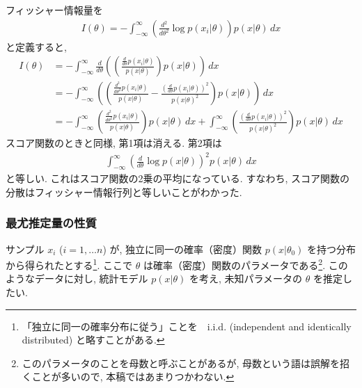 \documentclass{jarticle}
\begin{document}
フィッシャー情報量を
\begin{align}
I(\theta)=-\int^{\infty}_{-\infty}\left(\frac{d^2}{d \theta^2} \log p(x_i | \theta)\right) p(x|\theta) \, dx
\end{align}
と定義すると, 
\begin{align}
I(\theta)&=-\int^{\infty}_{-\infty}\frac{d}{d \theta} \left(\left(\frac{\frac{d}{d\theta} p(x_i | \theta)}{p(x|\theta)}\right) p(x|\theta) \right) \, dx \\
&=-\int^{\infty}_{-\infty}\left(\left(\frac{\frac{d^2}{d\theta^2} p(x_i | \theta)}{p(x|\theta)} - \frac{ ( \frac{d}{d\theta} p(x_i | \theta))^2}{p(x|\theta)^2 }\right) p(x|\theta) \right) \, dx \\
&=-\int^{\infty}_{-\infty}\left(\frac{\frac{d^2}{d\theta^2} p(x_i | \theta)}{p(x|\theta)}\right) p(x|\theta) \, dx +\int^{\infty}_{-\infty}\left( \frac{ ( \frac{d}{d\theta} p(x_i | \theta))^2}{p(x|\theta)^2 }\right) p(x|\theta) \, dx
\end{align}
スコア関数のときと同様, 第1項は消える. 
第2項は
\begin{align}
\int^{\infty}_{-\infty}\left(\frac{d}{d\theta} \log p(x | \theta)\right)^2 p(x|\theta) \, dx 
\end{align}
と等しい. これはスコア関数の2乗の平均になっている. 
すなわち, スコア関数の分散はフィッシャー情報行列と等しいことがわかった. 

\subsubsection{最尤推定量の性質}
サンプル $x_i$ ($i=1,\ldots n$) が, 独立に同一の確率（密度）関数 $p(x|\theta_0)$ を持つ分布から得られたとする\footnote{ 「独立に同一の確率分布に従う」ことを　i.i.d. (independent and identically distributed) と略すことがある.}. ここで $\theta$ は確率（密度）関数のパラメータである\footnote{このパラメータのことを母数と呼ぶことがあるが, 母数という語は誤解を招くことが多いので, 本稿ではあまりつかわない.}.  
このようなデータに対し, 統計モデル $p(x|\theta)$ を考え, 未知パラメータの $\theta$ を推定したい.
\end{document}
